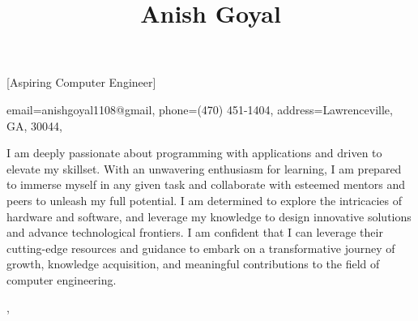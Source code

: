 \documentclass[sidebar-width=2.25in, primary=slate]{clean-resume}
\begin{document}
  \begin{sidebar}
    
    \title{Anish Goyal}[Aspiring Computer Engineer]
    
    
    \contact
    {
      email={anishgoyal1108@gmail},
      phone=(470) 451-1404,
      address={Lawrenceville, GA, 30044},
    }
    
    
    I am deeply passionate about programming with applications and driven to elevate my skillset. With an unwavering enthusiasm for learning, I am prepared to immerse myself in any given task and collaborate with esteemed mentors and peers to unleash my full potential. I am determined to explore the intricacies of hardware and software, and leverage my knowledge to design innovative solutions and advance technological frontiers. I am confident that I can leverage their cutting-edge resources and guidance to embark on a transformative journey of growth, knowledge acquisition, and meaningful contributions to the field of computer engineering. 
  \end{sidebar}%
  \sep%
\end{document}
